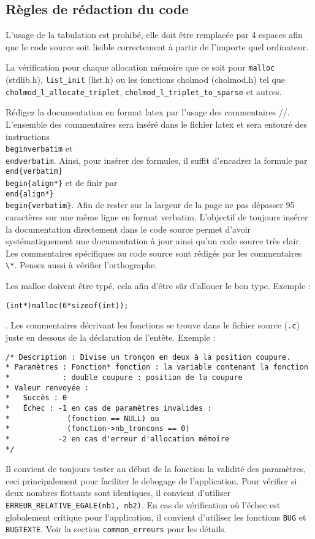 \documentclass{article}
\begin{document}
\subsection{Règles de rédaction du code}
L'usage de la tabulation est prohibé, elle doit être remplacée par 4 espaces afin que le code source soit lisible correctement à partir de l'importe quel ordinateur.\par
La vérification pour chaque allocation mémoire que ce soit pour \texttt{malloc} (stdlib.h), \texttt{list\_init} (list.h) ou les fonctions cholmod (cholmod.h) tel que \texttt{cholmod\-\_l\-\_allocate\-\_triplet}, \texttt{cholmod\-\_l\-\_triplet\-\_to\-\_sparse} et autres.\par
Rédigez la documentation en format latex par l'usage des commentaires //. L'ensemble des commentaires sera inséré dans le fichier latex et sera entouré des instructions \texttt{\\begin{verbatim}} et \texttt{\\end{verbatim}}.
Ainsi, pour insérer des formules, il suffit d'encadrer la formule par \texttt{\\end\{verbatim\}} \texttt{\\begin\{align*\}} et de finir par \texttt{\\end\{align*\}} \texttt{\\begin\{verbatim\}}.
Afin de rester sur la largeur de la page ne pas dépasser 95 caractères sur une même ligne en format verbatim. L'objectif de toujours insérer la documentation directement dans le code source permet d'avoir systématiquement une documentation à jour ainsi qu'un code source très clair.
Les commentaires spécifiques au code source sont rédigés par les commentaires \verb+\*+. Pensez aussi à vérifier l'orthographe.\par
Les malloc doivent être typé, cela afin d'être sûr d'allouer le bon type. Exemple : \begin{center}\texttt{(int*)malloc(6*sizeof(int));}\end{center}.
Les commentaires décrivant les fonctions se trouve dans le fichier source (\texttt{.c}) juste en dessous de la déclaration de l'entête. Exemple :
\begin{verbatim}
/* Description : Divise un tronçon en deux à la position coupure.
* Paramètres : Fonction* fonction : la variable contenant la fonction
*            : double coupure : position de la coupure
* Valeur renvoyée :
*   Succès : 0
*   Échec : -1 en cas de paramètres invalides :
*             (fonction == NULL) ou
*             (fonction->nb_troncons == 0)
*           -2 en cas d'erreur d'allocation mémoire
*/
\end{verbatim}
Il convient de toujours tester au début de la fonction la validité des paramètres, ceci principalement pour faciliter le debogage de l'application.
Pour vérifier si deux nombres flottants sont identiques, il convient d'utiliser \texttt{ERREUR\_RELATIVE\_EGALE(nb1, nb2)}.
En cas de vérification où l'échec est globalement critique pour l'application, il convient d'utiliser les fonctions \texttt{BUG} et \texttt{BUGTEXTE}. Voir la section \texttt{common\_erreurs} pour les détails.
\end{document}
